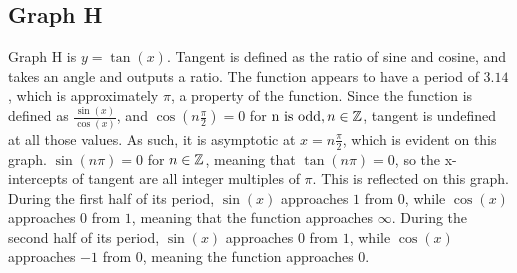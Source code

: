 \subsection{Graph H}

Graph H is $y=\tan(x)$.
Tangent is defined as the ratio of sine and cosine, and takes an angle and outputs a ratio.
The function appears to have a period of $3.14$, which is approximately $\pi$, a property of the function.
Since the function is defined as $\frac{\sin(x)}{\cos(x)}$, and ${\cos(n{\frac{\pi}{2}})=0}$ for ${\text{n is odd}, n\in \mathbb{Z}}$, tangent is undefined at all those values.
As such, it is asymptotic at $x={n{\frac{\pi}{2}}}$, which is evident on this graph.
${\sin(n\pi)=0}$ for ${n \in \mathbb{Z}}$, meaning that ${\tan(n{\pi})=0}$, so the x-intercepts of tangent are all integer multiples of ${\pi}$.
This is reflected on this graph.
During the first half of its period, ${\sin(x)}$ approaches $1$ from $0$, while ${\cos(x)}$ approaches $0$ from $1$, meaning that the function approaches $\infty$.
During the second half of its period, ${\sin(x)}$ approaches $0$ from $1$, while ${\cos(x)}$ approaches $-1$ from $0$, meaning the function approaches $0$.

